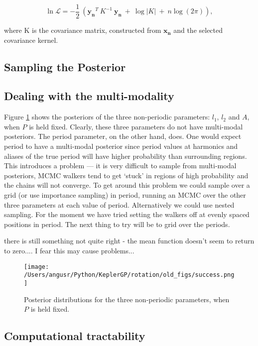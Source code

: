 \documentclass[12pt,preprint]{aastex}
\begin{document}
\begin{equation}
	\ln{\mathcal{L}} = -\frac{1}{2}~\left(\mathbf{y_n}^T~K^{-1}~\mathbf{y_n}~ + ~\log{|K| ~+~ n\log(2\pi)} \right),
\end{equation}

where K is the covariance matrix, constructed from $\mathbf{x_n}$ and the selected covariance kernel.

\subsection{Sampling the Posterior}

\subsection{Dealing with the multi-modality}

Figure \ref{fig:fixed_period} shows the posteriors of the three non-periodic parameters: $l_1$, $l_2$ and $A$, when $P$ is held fixed.
Clearly, these three parameters do not have multi-modal posteriors.
The period parameter, on the other hand, does.
One would expect period to have a multi-modal posterior since period values at harmonics and aliases of the true period will have higher probability than surrounding regions.
This introduces a problem --- it is very difficult to sample from multi-modal posteriors, MCMC walkers tend to get `stuck' in regions of high probability and the chains will not converge.
To get around this problem we could sample over a grid (or use importance sampling) in period, running an MCMC over the other three parameters at each value of period.
Alternatively we could use nested sampling.
For the moment we have tried setting the walkers off at evenly spaced positions in period.
The next thing to try will be to grid over the periods.

there is still something not quite right - the mean function doesn't seem to return to zero.... I fear this may cause problems...

\begin{figure}[ht]
\begin{center}
\texttt{[image: /Users/angusr/Python/KeplerGP/rotation/old\_figs/success.png]}
\caption{Posterior distributions for the three non-periodic parameters, when $P$ is held fixed.}
\label{fig:fixed_period}
\end{center}
\end{figure}

\subsection{Computational tractability}
\end{document}
